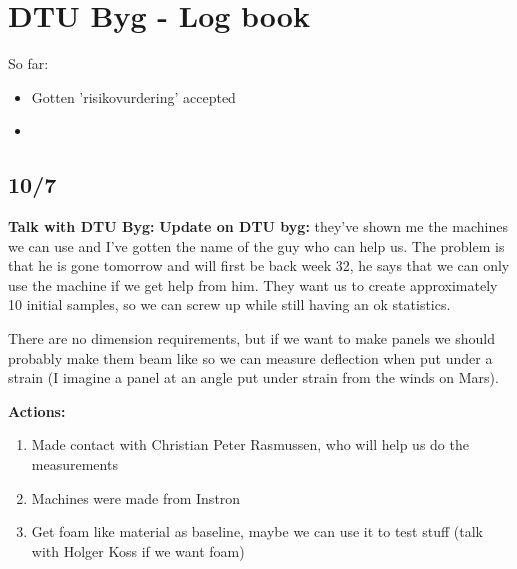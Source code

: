 \section{DTU Byg - Log book}
So far: 
\begin{itemize}
    \item Gotten 'risikovurdering' accepted
    \item 
\end{itemize}
\subsection{10/7}
\textbf{Talk with DTU Byg:}
\textbf{Update on DTU byg:}
they've shown me the machines we can use and I've gotten the name of the guy who can help us. The problem is that he is gone tomorrow and will first be back week 32, he says that we can only use the machine if we get help from him. They want us to create approximately 10 initial samples, so we can screw up while still having an ok statistics.

There are no dimension requirements, but if we want to make panels we should probably make them beam like so we can measure deflection when put under a strain (I imagine a panel at an angle put under strain from the winds on Mars). 

\textbf{Actions:}
\begin{enumerate}
    \item Made contact with Christian Peter Rasmussen, who will help us do the measurements
    \item Machines were made from Instron
    \item Get foam like material as baseline, maybe we can use it to test stuff (talk with Holger Koss if we want foam)
\end{enumerate}
